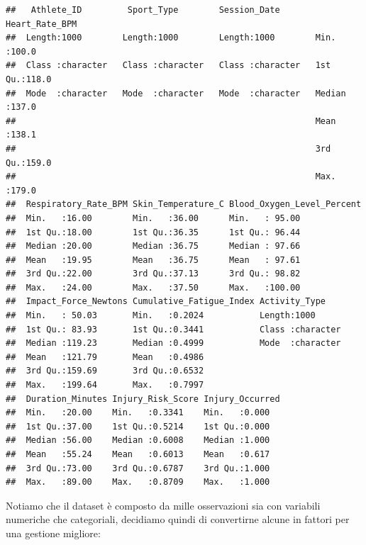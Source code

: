 \documentclass[
]{article}
\newenvironment{Shaded}{\begin{snugshade}}{\end{snugshade}}
\newcommand{\FunctionTok}[1]{\textcolor[rgb]{0.13,0.29,0.53}{\textbf{#1}}}
\newcommand{\NormalTok}[1]{#1}
\newcommand{\OtherTok}[1]{\textcolor[rgb]{0.56,0.35,0.01}{#1}}
\newcommand{\SpecialCharTok}[1]{\textcolor[rgb]{0.81,0.36,0.00}{\textbf{#1}}}
\newcommand{\StringTok}[1]{\textcolor[rgb]{0.31,0.60,0.02}{#1}}
\begin{document}
\begin{verbatim}
##   Athlete_ID         Sport_Type        Session_Date       Heart_Rate_BPM 
##  Length:1000        Length:1000        Length:1000        Min.   :100.0  
##  Class :character   Class :character   Class :character   1st Qu.:118.0  
##  Mode  :character   Mode  :character   Mode  :character   Median :137.0  
##                                                           Mean   :138.1  
##                                                           3rd Qu.:159.0  
##                                                           Max.   :179.0  
##  Respiratory_Rate_BPM Skin_Temperature_C Blood_Oxygen_Level_Percent
##  Min.   :16.00        Min.   :36.00      Min.   : 95.00            
##  1st Qu.:18.00        1st Qu.:36.35      1st Qu.: 96.44            
##  Median :20.00        Median :36.75      Median : 97.66            
##  Mean   :19.95        Mean   :36.75      Mean   : 97.61            
##  3rd Qu.:22.00        3rd Qu.:37.13      3rd Qu.: 98.82            
##  Max.   :24.00        Max.   :37.50      Max.   :100.00            
##  Impact_Force_Newtons Cumulative_Fatigue_Index Activity_Type     
##  Min.   : 50.03       Min.   :0.2024           Length:1000       
##  1st Qu.: 83.93       1st Qu.:0.3441           Class :character  
##  Median :119.23       Median :0.4999           Mode  :character  
##  Mean   :121.79       Mean   :0.4986                             
##  3rd Qu.:159.69       3rd Qu.:0.6532                             
##  Max.   :199.64       Max.   :0.7997                             
##  Duration_Minutes Injury_Risk_Score Injury_Occurred
##  Min.   :20.00    Min.   :0.3341    Min.   :0.000  
##  1st Qu.:37.00    1st Qu.:0.5214    1st Qu.:0.000  
##  Median :56.00    Median :0.6008    Median :1.000  
##  Mean   :55.24    Mean   :0.6013    Mean   :0.617  
##  3rd Qu.:73.00    3rd Qu.:0.6787    3rd Qu.:1.000  
##  Max.   :89.00    Max.   :0.8709    Max.   :1.000
\end{verbatim}

Notiamo che il dataset è composto da mille osservazioni sia con
variabili numeriche che categoriali, decidiamo quindi di convertirne
alcune in fattori per una gestione migliore:

\begin{Shaded}
\end{Shaded}
\end{document}
